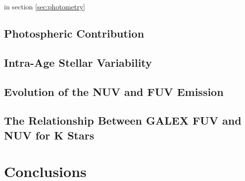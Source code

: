 \documentclass[preprint2]{aastex62}
\begin{document}
in section \ref{sec:photometry}





\subsection{Photospheric Contribution}

\subsection{Intra-Age Stellar Variability}

\subsection{Evolution of the NUV and FUV Emission}

\subsection{The Relationship Between GALEX FUV and NUV for K Stars}

\section{Conclusions}


\end{document}
